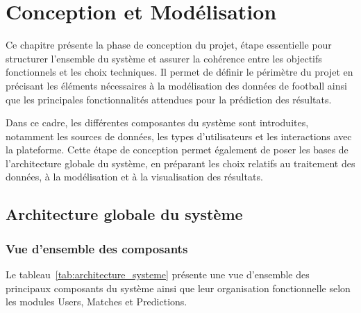 \chapter{Conception et Modélisation}

Ce chapitre présente la phase de conception du projet, étape essentielle pour structurer l’ensemble du système et assurer la cohérence entre les objectifs fonctionnels et les choix techniques. Il permet de définir le périmètre du projet en précisant les éléments nécessaires à la modélisation des données de football ainsi que les principales fonctionnalités attendues pour la prédiction des résultats.

Dans ce cadre, les différentes composantes du système sont introduites, notamment les sources de données, les types d’utilisateurs et les interactions avec la plateforme. Cette étape de conception permet également de poser les bases de l’architecture globale du système, en préparant les choix relatifs au traitement des données, à la modélisation et à la visualisation des résultats.

\section{Architecture globale du système}

\subsection{Vue d’ensemble des composants}

Le tableau~\ref{tab:architecture_systeme} présente une vue d’ensemble des principaux composants du système ainsi que leur organisation fonctionnelle selon les modules Users, Matches et Predictions.

